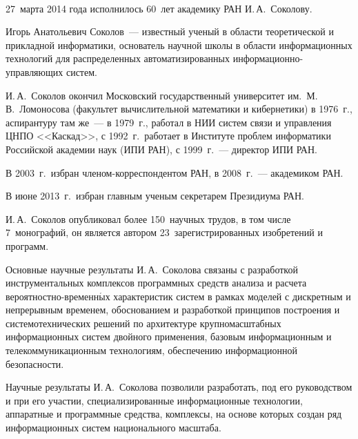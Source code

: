       \begin{multicols}{2}


            \begin{center}
\mbox{%
\epsfxsize=78mm
}
\end{center}





 27~марта 2014 года исполнилось 60~лет академику РАН И.\,А.~Соколову.

Игорь Анатольевич Соколов~--- известный ученый в области теоретической и
прикладной информатики, основатель научной школы в области информационных
технологий для распределенных\linebreak
 автоматизи\-рованных ин\-фор\-ма\-ци\-он\-но-управ\-ля\-ющих сис\-тем.

И.\,А.~Соколов окончил Московский государственный университет
им.\ М.\,В.~Ломоносова (факультет вычислительной математики и кибернетики) в
1976~г., аспирантуру там же~--- в 1979~г., работал в НИИ систем связи и
управления \mbox{ЦНПО} <<Каскад>>, с 1992~г.\ работает в Институте
проблем информатики
Российской академии наук (ИПИ РАН), с 1999~г.~--- директор ИПИ РАН.

В 2003~г.\ избран членом-корреспондентом РАН, в 2008~г.~--- академиком РАН.

В июне 2013~г.\ избран главным ученым секретарем Президиума РАН.

И.\,А.~Соколов опубликовал более 150~научных трудов, в том числе 7~монографий, он является автором 23~зарегистрированных изобретений и программ.

Основные научные результаты И.\,А.~Соколова связаны с разработкой инструментальных комплексов программных средств анализа и расчета
вероятностно-временн$\acute{\mbox{ы}}$х характеристик систем в рамках моделей с дискретным и непрерывным временем, обоснованием и разработкой принципов построения и системотехнических решений по архитектуре крупномасштабных информационных систем двойного применения, базовым информационным и телекоммуникационным технологиям, обеспечению информационной безопасности.

Научные результаты И.\,А.~Соколова позволили разработать, под его руководством и при его участии, специализированные информационные технологии, аппаратные и программные средства, комплексы, на основе которых создан ряд информационных систем национального масштаба.


\end{multicols}
